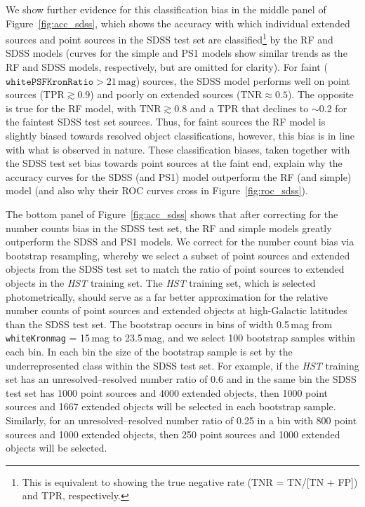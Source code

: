 \documentclass[twocolumn, dvipdfmx]{aastex62}
\begin{document}
\begin{CJK*}{UTF8}{gbsn}
We show further evidence for this classification bias in the middle panel of
Figure~\ref{fig:acc_sdss}, which shows the accuracy with which individual
extended sources and point sources in the SDSS test set are
classified\footnote{This is equivalent to showing the true negative rate
(TNR = TN/[TN + FP]) and TPR, respectively.} by the RF and SDSS models
(curves for the simple and PS1 models show similar trends as the RF and SDSS
models, respectively, but are omitted for clarity). For faint
($\mathtt{whitePSFKronRatio} > 21\,\mathrm{mag}$) sources, the SDSS model
performs well on point sources ($\mathrm{TPR} \gtrsim 0.9$) and poorly on
extended sources ($\mathrm{TNR} \approx 0.5$). The opposite is true for the
RF model, with $\mathrm{TNR} \gtrsim 0.8$ and a TPR that declines to
$\sim$0.2 for the faintest SDSS test set sources. Thus, for faint sources
the RF model is slightly biased towards resolved object classifications,
however, this bias is in line with what is observed in nature. These
classification biases, taken together with the SDSS test set bias towards
point sources at the faint end, explain why the accuracy curves for the SDSS
(and PS1) model outperform the RF (and simple) model (and also why their ROC
curves cross in Figure~\ref{fig:roc_sdss}).

The bottom panel of Figure~\ref{fig:acc_sdss} shows that after correcting
for the number counts bias in the SDSS test set, the RF and simple models
greatly outperform the SDSS and PS1 models. We correct for the number count
bias via bootstrap resampling, whereby we select a subset of point sources
and extended objects from the SDSS test set to match the ratio of point
sources to extended objects in the \textit{HST} training set. The
\textit{HST} training set, which is selected photometrically, should serve
as a far better approximation for the relative number counts of point
sources and extended objects at high-Galactic latitudes than the SDSS test
set. The bootstrap occurs in bins of width 0.5\,mag from
\texttt{whiteKronmag} = 15\,mag to 23.5\,mag, and we select 100 bootstrap
samples within each bin. In each bin the size of the bootstrap sample is set
by the underrepresented class within the SDSS test set. For example, if the
\textit{HST} training set has an unresolved--resolved number ratio of 0.6
and in the same bin the SDSS test set has 1000 point sources and 4000
extended objects, then 1000 point sources and 1667 extended objects will be
selected in each bootstrap sample. Similarly, for an unresolved--resolved
number ratio of 0.25 in a bin with 800 point sources and 1000 extended
objects, then 250 point sources and 1000 extended objects will be selected.


\end{CJK*}
\end{document}
